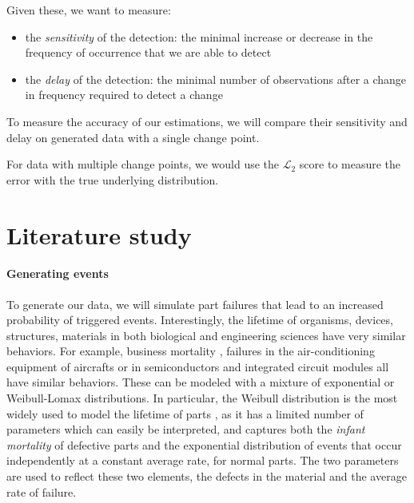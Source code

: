 \documentclass{kththesis}
\begin{document}
Given these, we want to measure:

\begin{itemize}

\item the \emph{sensitivity} of the detection: the minimal increase or decrease in the frequency of occurrence that we are able to detect
\item the \emph{delay} of the detection: the minimal number of observations after a change in frequency required to detect a change

\end{itemize}

To measure the accuracy of our estimations, we will compare their sensitivity and delay on generated data with a single change point.

For data with multiple change points, we would use the $\mathcal{L}_2$ score to measure the error with the true underlying distribution.

\section{Literature study}

\paragraph{Generating events}
\label{part-lifetime}

To generate our data, we will simulate part failures that lead to an increased probability of triggered events. Interestingly, the lifetime of organisms, devices, structures, materials in both biological and engineering sciences have very similar behaviors. 
For example, business mortality \parencite{lomax1954}, failures in the air-conditioning equipment of aircrafts or in semiconductors \parencite{proschan1963} and integrated circuit modules \parencite{saunders1983} all have similar behaviors. 
These can be modeled with a mixture of exponential or Weibull-Lomax distributions. In particular, the Weibull distribution \parencite{weibull1951} is the most widely used to model the lifetime of parts \parencite{anderson2005}, as it has a limited number of parameters which can easily be interpreted, and captures both the \emph{infant mortality} of defective parts and the exponential distribution of events that occur independently at a constant average rate, for normal parts. The two parameters are used to reflect these two elements, the defects in the material and the average rate of failure.
\end{document}
